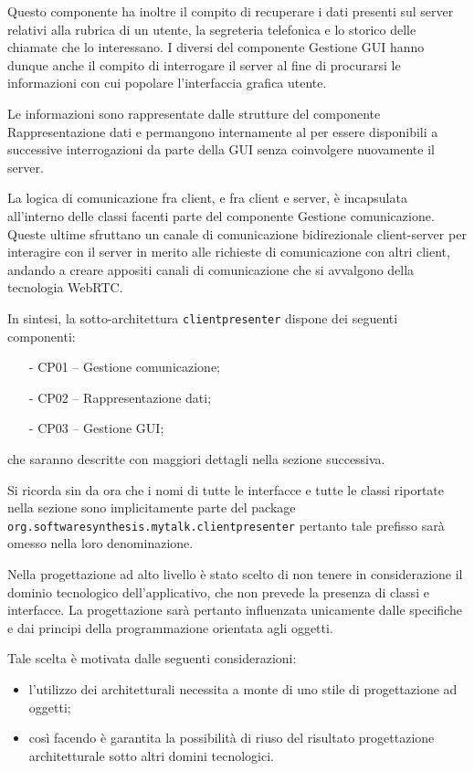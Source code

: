 Questo componente ha inoltre il compito di recuperare i dati presenti sul server relativi alla rubrica di un utente, la segreteria telefonica e lo storico delle chiamate che lo interessano. I diversi  del componente \textsf{Gestione GUI} hanno dunque anche il compito di interrogare il server al fine di procurarsi le informazioni con cui popolare l'interfaccia grafica utente.

Le informazioni sono rappresentate dalle strutture del componente \textsf{Rappresentazione dati} e permangono internamente al  per essere disponibili a successive interrogazioni da parte della GUI senza coinvolgere nuovamente il server.

La logica di comunicazione fra client, e fra client e server, è incapsulata all'interno delle classi facenti parte del componente \textsf{Gestione comunicazione}. Queste ultime sfruttano un canale di comunicazione bidirezionale client-server per interagire con il server in merito alle richieste di comunicazione con altri client, andando a creare appositi canali di comunicazione che si avvalgono della tecnologia WebRTC\@.

In sintesi, la sotto-architettura \texttt{clientpresenter} dispone dei seguenti componenti:
\begin{itemize}[noitemsep,nolistsep]
	\item[-] \textsf{CP01 -- Gestione comunicazione};
	\item[-] \textsf{CP02 -- Rappresentazione dati};
	\item[-] \textsf{CP03 -- Gestione GUI};
\end{itemize}
che saranno descritte con maggiori dettagli nella sezione successiva.

Si ricorda sin da ora che i nomi di tutte le interfacce e tutte le classi riportate nella sezione sono implicitamente parte del package \texttt{org.softwaresynthesis.mytalk.clientpresenter} pertanto tale prefisso sarà omesso nella loro denominazione.

Nella progettazione ad alto livello è stato scelto di non tenere in considerazione il dominio tecnologico dell'applicativo, che non prevede la presenza di classi e interfacce. La progettazione sarà pertanto influenzata unicamente dalle specifiche e dai principi della programmazione orientata agli oggetti.

Tale scelta è motivata dalle seguenti considerazioni:
\begin{itemize}
   \item l'utilizzo dei  architetturali necessita a monte di uno stile di progettazione ad oggetti;
   \item così facendo è garantita la possibilità di riuso del risultato progettazione architetturale sotto altri domini tecnologici.
\end{itemize}

